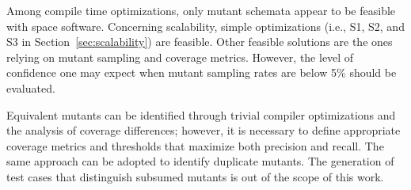 Among compile time optimizations, only mutant schemata appear to be feasible with space software.
Concerning scalability, simple optimizations (i.e., S1, S2, and S3 in Section~\ref{sec:scalability}) are feasible. Other feasible solutions are the ones relying on mutant sampling and coverage metrics. However, the level of confidence one may expect when mutant sampling rates are below 5\% should be evaluated. 

Equivalent mutants can be identified through trivial compiler optimizations and the analysis of coverage differences; however, it is necessary to define appropriate coverage metrics and thresholds that maximize both precision and recall. The same approach can be adopted to identify duplicate mutants. The generation of test cases that distinguish subsumed mutants is out of the scope of this work.



